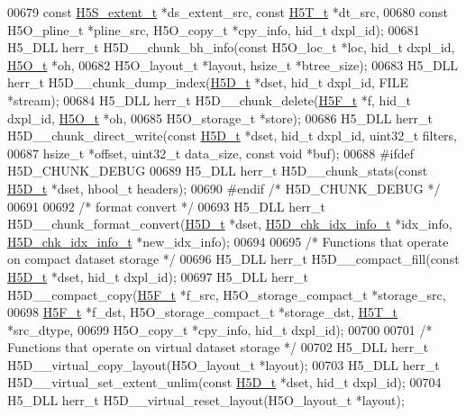 \begin{DoxyCode}
00679     \textcolor{keyword}{const} \hyperlink{struct_h5_s__extent__t}{H5S\_extent\_t} *ds\_extent\_src, \textcolor{keyword}{const} \hyperlink{struct_h5_t__t}{H5T\_t} *dt\_src,
00680     \textcolor{keyword}{const} H5O\_pline\_t *pline\_src, H5O\_copy\_t *cpy\_info, hid\_t dxpl\_id);
00681 H5\_DLL herr\_t H5D\_\_chunk\_bh\_info(\textcolor{keyword}{const} H5O\_loc\_t *loc, hid\_t dxpl\_id, \hyperlink{struct_h5_o__t}{H5O\_t} *oh,
00682     H5O\_layout\_t *layout, hsize\_t *btree\_size);
00683 H5\_DLL herr\_t H5D\_\_chunk\_dump\_index(\hyperlink{struct_h5_d__t}{H5D\_t} *dset, hid\_t dxpl\_id, FILE *stream);
00684 H5\_DLL herr\_t H5D\_\_chunk\_delete(\hyperlink{struct_h5_f__t}{H5F\_t} *f, hid\_t dxpl\_id, \hyperlink{struct_h5_o__t}{H5O\_t} *oh,
00685     H5O\_storage\_t *store);
00686 H5\_DLL herr\_t H5D\_\_chunk\_direct\_write(\textcolor{keyword}{const} \hyperlink{struct_h5_d__t}{H5D\_t} *dset, hid\_t dxpl\_id, uint32\_t filters, 
00687          hsize\_t *offset, uint32\_t data\_size, \textcolor{keyword}{const} \textcolor{keywordtype}{void} *buf);
00688 \textcolor{preprocessor}{#ifdef H5D\_CHUNK\_DEBUG}
00689 H5\_DLL herr\_t H5D\_\_chunk\_stats(\textcolor{keyword}{const} \hyperlink{struct_h5_d__t}{H5D\_t} *dset, hbool\_t headers);
00690 \textcolor{preprocessor}{#endif }\textcolor{comment}{/* H5D\_CHUNK\_DEBUG */}\textcolor{preprocessor}{}
00691 
00692 \textcolor{comment}{/* format convert */}
00693 H5\_DLL herr\_t H5D\_\_chunk\_format\_convert(\hyperlink{struct_h5_d__t}{H5D\_t} *dset, \hyperlink{struct_h5_d__chk__idx__info__t}{H5D\_chk\_idx\_info\_t} *idx\_info, 
      \hyperlink{struct_h5_d__chk__idx__info__t}{H5D\_chk\_idx\_info\_t} *new\_idx\_info);
00694 
00695 \textcolor{comment}{/* Functions that operate on compact dataset storage */}
00696 H5\_DLL herr\_t H5D\_\_compact\_fill(\textcolor{keyword}{const} \hyperlink{struct_h5_d__t}{H5D\_t} *dset, hid\_t dxpl\_id);
00697 H5\_DLL herr\_t H5D\_\_compact\_copy(\hyperlink{struct_h5_f__t}{H5F\_t} *f\_src, H5O\_storage\_compact\_t *storage\_src,
00698     \hyperlink{struct_h5_f__t}{H5F\_t} *f\_dst, H5O\_storage\_compact\_t *storage\_dst, \hyperlink{struct_h5_t__t}{H5T\_t} *src\_dtype,
00699     H5O\_copy\_t *cpy\_info, hid\_t dxpl\_id);
00700 
00701 \textcolor{comment}{/* Functions that operate on virtual dataset storage */}
00702 H5\_DLL herr\_t H5D\_\_virtual\_copy\_layout(H5O\_layout\_t *layout);
00703 H5\_DLL herr\_t H5D\_\_virtual\_set\_extent\_unlim(\textcolor{keyword}{const} \hyperlink{struct_h5_d__t}{H5D\_t} *dset, hid\_t dxpl\_id);
00704 H5\_DLL herr\_t H5D\_\_virtual\_reset\_layout(H5O\_layout\_t *layout);

\end{DoxyCode}
